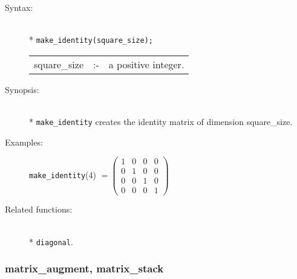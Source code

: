 \begin{description}
\item[Syntax:]\mbox{}\\*
\texttt{make\_identity(square\_size);}\\[2mm]
\begin{tabular}{l l l}
square\_size &:-& a positive integer.
\end{tabular}

\item[Synopsis:]\mbox{}\\*
\texttt{make\_identity} creates the identity matrix of
                dimension square\_size.

\item[Examples:]
\begin{flushleft}
\texttt{make\_identity}(4) \(=
        \begin{pmatrix} 1 & 0 & 0 & 0 \\ 0 & 1 & 0 & 0 \\
                        0 & 0 & 1 & 0 \\ 0 & 0 & 0 & 1
 \end{pmatrix}\)
\end{flushleft}

\item[Related functions:]\mbox{}\\*
\texttt{diagonal}.
\end{description}


\subsubsection{matrix\_augment, matrix\_stack}
\label{linalg:matrix_augment}


